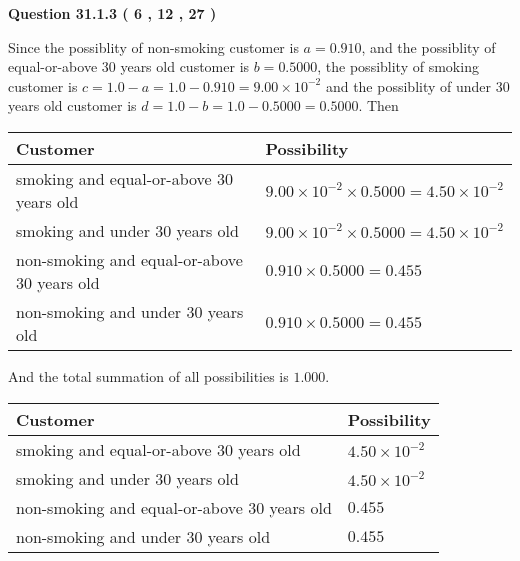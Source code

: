 \documentclass[12pt]{article}
\begin{document}
 
 
  
\vspace{0.2in}
  
{\textbf{\Large{Question
31.1.3 
 (           6 ,          12 ,          27 )
}}}
  
  
 
 
\noindent{}

Since the possiblity of  %
 non-smoking customer is $ a =  %
0.910 $,
and the possiblity of  %
equal-or-above 30 years old customer is $ b =  %
0.5000 $,
the possiblity of  %
smoking customer is $ c = 1.0 - a = 1.0 -
0.910
=  %
9.00 \times 10^{-2} $ and the possiblity of  %
under 30 years old
customer is $ d = 1.0 - b = 1.0 -  %
0.5000 =  %
0.5000  $.
Then
 
\noindent
\begin{tabular}{|l|l|}
\hline
Customer & Possibility \\
\hline
smoking  and  %
equal-or-above 30 years old  &
  $ %
9.00 \times 10^{-2} \times  %
0.5000 =  %
4.50 \times 10^{-2}$ \\
\hline
smoking  and  %
under 30 years old &
  $ %
9.00 \times 10^{-2} \times  %
0.5000 =  %
4.50 \times 10^{-2}$ \\
\hline
 non-smoking and  %
equal-or-above 30 years old  &
  $ %
0.910 \times  %
0.5000 =  %
0.455$ \\
\hline
 non-smoking and  %
under 30 years old &
  $ %
0.910 \times  %
0.5000 =  %
0.455$ \\
\hline
\end{tabular}
 
\noindent
And the total summation of all possibilities is $  %
1.000 $.
 
 
 
 
 
 
\noindent{}

 
\noindent
\begin{tabular}{|l|l|}
\hline
Customer & Possibility \\
\hline
smoking  and  %
equal-or-above 30 years old &
  $ %
4.50 \times 10^{-2}$ \\
\hline
smoking  and  %
under 30 years old &
  $ %
4.50 \times 10^{-2}$ \\
\hline
 non-smoking and  %
equal-or-above 30 years old &
  $ %
0.455$ \\
\hline
 non-smoking and  %
under 30 years old &
  $ %
0.455$ \\
\hline
\end{tabular}
 
\end{document}
